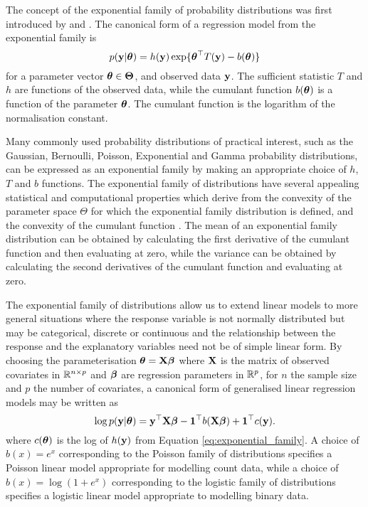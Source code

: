 The concept of the exponential family of probability distributions was first
introduced by \cite{Koopman1935} and \cite{pitman_1936}. The canonical form of a
regression model from the exponential family is
\begin{equation}\label{eq:exponential_family}
	p({\bf y} | {\boldsymbol \theta}) = h({\bf y}) \exp \{ {\boldsymbol \theta}^\top T({\bf y}) - b({\boldsymbol \theta}) \}
\end{equation}
for a parameter vector ${\boldsymbol \theta} \in \mathbf{\Theta}$, and observed data ${\bf y}$.
The sufficient statistic $T$ and $h$ are functions of the observed data, while
the cumulant function $b({\boldsymbol \theta})$ is a function of the parameter ${\boldsymbol \theta}$. The
cumulant function is the logarithm of the normalisation constant.

Many commonly used probability distributions of practical interest, such as the
Gaussian, Bernoulli, Poisson, Exponential and Gamma probability distributions,
can be expressed as an exponential family by making an appropriate choice of
$h$, $T$ and $b$ functions. The exponential family of distributions have several
appealing statistical and computational properties which derive from the
convexity of the parameter space $\Theta$ for which the exponential family
distribution is defined, and the convexity of the cumulant function
\cite{Jordan2010}. The mean of an exponential family distribution can be
obtained by calculating the first derivative of the cumulant function and then
evaluating at zero, while the variance can be obtained by calculating the second
derivatives of the cumulant function and evaluating at zero.

The exponential family of distributions allow us to extend linear models to more
general situations where the response variable is not normally distributed but
may be categorical, discrete or continuous and the relationship between the
response and the explanatory variables need not be of simple linear form.  By
choosing the parameterisation ${\boldsymbol \theta} = {\bf X} {\boldsymbol \beta}$ where ${\bf X}$ is the matrix
of observed covariates in ${\mathbb{R}}^{n \times p}$ and ${\boldsymbol \beta}$ are regression
parameters in ${\mathbb{R}}^p$, for $n$ the sample size and $p$ the number of covariates,
a canonical form of generalised linear regression models may be written as
\begin{equation}\label{eq:glm}
	\log p({\bf y} | {\boldsymbol \theta}) = {\bf y}^\top {\bf X} {\boldsymbol\beta} - {\bf 1}^\top b({\bf X} {\boldsymbol \beta}) + {\bf 1}^\top c({\bf y}).
\end{equation}
where $c({\boldsymbol \theta})$ is the log of $h({\bf y})$ from Equation
\ref{eq:exponential_family}. A choice of $b(x) = e^x$ corresponding to the
Poisson family of distributions specifies a Poisson linear model appropriate for
modelling count data, while a choice of $b(x) = \log(1 + e^x)$ corresponding to
the logistic family of distributions specifies a logistic linear model
appropriate to modelling binary data.

